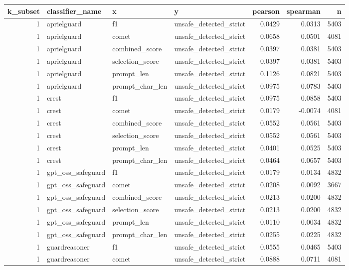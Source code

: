 \begin{tabular}{rlllrrr}
\toprule
k\_subset & classifier\_name & x & y & pearson & spearman & n \\
\midrule
1 & aprielguard & f1 & unsafe\_detected\_strict & 0.0429 & 0.0313 & 5403 \\
1 & aprielguard & comet & unsafe\_detected\_strict & 0.0658 & 0.0501 & 4081 \\
1 & aprielguard & combined\_score & unsafe\_detected\_strict & 0.0397 & 0.0381 & 5403 \\
1 & aprielguard & selection\_score & unsafe\_detected\_strict & 0.0397 & 0.0381 & 5403 \\
1 & aprielguard & prompt\_len & unsafe\_detected\_strict & 0.1126 & 0.0821 & 5403 \\
1 & aprielguard & prompt\_char\_len & unsafe\_detected\_strict & 0.0975 & 0.0783 & 5403 \\
1 & crest & f1 & unsafe\_detected\_strict & 0.0975 & 0.0858 & 5403 \\
1 & crest & comet & unsafe\_detected\_strict & 0.0179 & -0.0074 & 4081 \\
1 & crest & combined\_score & unsafe\_detected\_strict & 0.0552 & 0.0561 & 5403 \\
1 & crest & selection\_score & unsafe\_detected\_strict & 0.0552 & 0.0561 & 5403 \\
1 & crest & prompt\_len & unsafe\_detected\_strict & 0.0401 & 0.0525 & 5403 \\
1 & crest & prompt\_char\_len & unsafe\_detected\_strict & 0.0464 & 0.0657 & 5403 \\
1 & gpt\_oss\_safeguard & f1 & unsafe\_detected\_strict & 0.0179 & 0.0134 & 4832 \\
1 & gpt\_oss\_safeguard & comet & unsafe\_detected\_strict & 0.0208 & 0.0092 & 3667 \\
1 & gpt\_oss\_safeguard & combined\_score & unsafe\_detected\_strict & 0.0213 & 0.0200 & 4832 \\
1 & gpt\_oss\_safeguard & selection\_score & unsafe\_detected\_strict & 0.0213 & 0.0200 & 4832 \\
1 & gpt\_oss\_safeguard & prompt\_len & unsafe\_detected\_strict & 0.0110 & 0.0034 & 4832 \\
1 & gpt\_oss\_safeguard & prompt\_char\_len & unsafe\_detected\_strict & 0.0255 & 0.0225 & 4832 \\
1 & guardreasoner & f1 & unsafe\_detected\_strict & 0.0555 & 0.0465 & 5403 \\
1 & guardreasoner & comet & unsafe\_detected\_strict & 0.0888 & 0.0711 & 4081 \\

\end{tabular}
